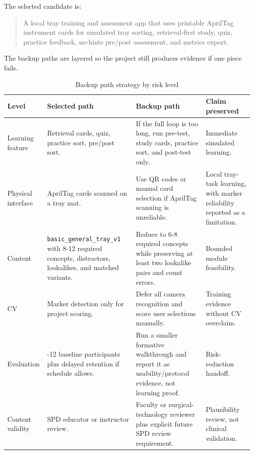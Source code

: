 \documentclass[10pt,a4paper]{article}
\begin{document}
The selected candidate is:
\begin{quote}
A local tray training and assessment app that uses printable AprilTag
instrument cards for simulated tray sorting, retrieval-first study, quiz,
practice feedback, no-hints pre/post assessment, and metrics export.
\end{quote}
The backup paths are layered so the project still produces evidence if one
piece fails.
\begin{table}[H]
\centering
\caption{Backup path strategy by risk level}
\label{tab:backup-path-strategy-by-risk-level}
\small\renewcommand{\arraystretch}{1.2}\setlength{\tabcolsep}{4pt}
\begin{tabularx}{\textwidth}{|>{\raggedright\arraybackslash}X|>{\raggedright\arraybackslash}X|>{\raggedright\arraybackslash}X|>{\raggedright\arraybackslash}X|}
\hline
Level & Selected path & Backup path & Claim preserved \\
\hline
Learning feature & Retrieval cards, quiz, practice sort, pre/post sort. & If the full loop is too long, run pre-test, study cards, practice sort, and post-test only. & Immediate simulated learning. \\
\hline
Physical interface & AprilTag cards scanned on a tray mat. & Use QR codes or manual card selection if AprilTag scanning is unreliable. & Local tray-task learning, with marker reliability reported as a limitation. \\
\hline
Content & \texttt{basic\_general\_tray\_v1} with 8-12 required concepts, distractors, lookalikes, and matched variants. & Reduce to 6-8 required concepts while preserving at least two lookalike pairs and count errors. & Bounded module feasibility. \\
\hline
CV & Marker detection only for project scoring. & Defer all camera recognition and score user selections manually. & Training evidence without CV overclaim. \\
\hline
Evaluation & 8-12 baseline participants plus delayed retention if schedule allows. & Run a smaller formative walkthrough and report it as usability/protocol evidence, not learning proof. & Risk-reduction handoff. \\
\hline
Content validity & SPD educator or instructor review. & Faculty or surgical-technology reviewer plus explicit future SPD review requirement. & Plausibility review, not clinical validation. \\
\hline
\end{tabularx}
\end{table}
\end{document}
